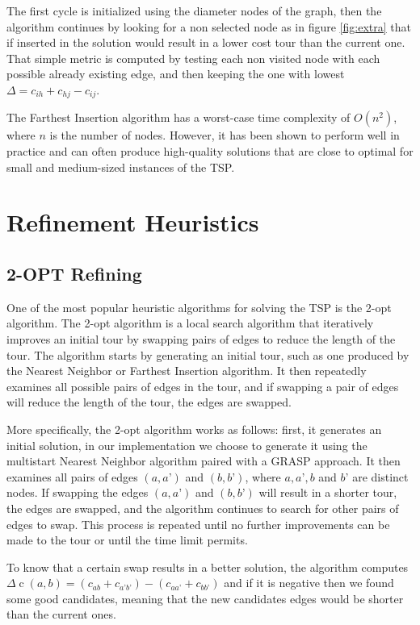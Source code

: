 The first cycle is initialized using the diameter nodes of the graph, then the algorithm continues by looking for a non selected node as in figure \ref{fig:extra} that if inserted in the solution would result in a lower cost tour than the current one.
That simple metric is computed by testing each non visited node with each possible already existing edge, and then keeping the one with lowest $\Delta = c_{ih} + c_{hj} - c_{ij}$.

The Farthest Insertion algorithm has a worst-case time complexity of $O(n^2)$, where $n$ is the number of nodes. However, it has been shown to perform well in practice and can often produce high-quality solutions that are close to optimal for small and medium-sized instances of the TSP.

\section{Refinement Heuristics}
\subsection{2-OPT Refining}
One of the most popular heuristic algorithms for solving the TSP is the 2-opt algorithm.
The 2-opt algorithm is a local search algorithm that iteratively improves an initial tour by swapping pairs of edges to reduce the length of the tour. The algorithm starts by generating an initial tour, such as one produced by the Nearest Neighbor or Farthest Insertion algorithm. It then repeatedly examines all possible pairs of edges in the tour, and if swapping a pair of edges will reduce the length of the tour, the edges are swapped.

More specifically, the 2-opt algorithm works as follows: first, it generates an initial solution, in our implementation we choose to generate it using the multistart Nearest Neighbor algorithm paired with a GRASP approach. It then examines all pairs of edges $(a,a’)$ and $(b,b’)$, where $a,a’,b$ and $b’$ are distinct nodes. If swapping the edges $(a,a’)$ and $(b,b’)$ will result in a shorter tour, the edges are swapped, and the algorithm continues to search for other pairs of edges to swap. This process is repeated until no further improvements can be made to the tour or until the time limit permits.

To know that a certain swap results in a better solution, the algorithm computes $\Delta \operatorname{c}(a,b) = (c_{ab} + c_{a’b’}) - (c_{aa’} + c_{bb’})$ and if it is negative then we found some good candidates, meaning that the new candidates edges would be shorter than the current ones.

